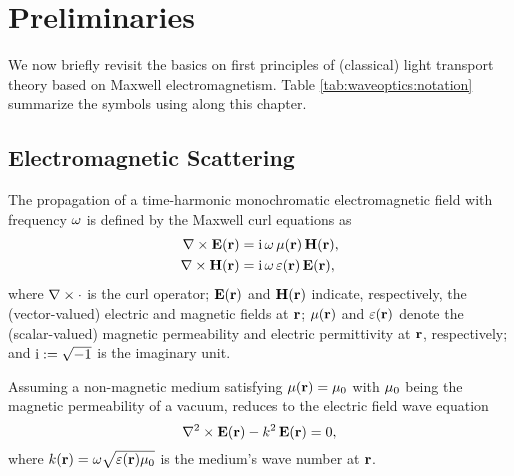 \section{Preliminaries}
\label{sec:waveoptics:prelim}

We now briefly revisit the basics on first principles of (classical) light transport theory based on Maxwell electromagnetism. Table \ref{tab:waveoptics:notation} summarize the symbols using along this chapter.



\subsection{Electromagnetic Scattering}
\label{ssec:prelim_maxwells}

The propagation of a time-harmonic monochromatic electromagnetic field with frequency $\omega$ is defined by the Maxwell curl equations as
\begin{equation}
    \begin{aligned}
        \nabla\times\mathbf{E}(\mathbf{r}) &= \text{i}\,\omega\,\mu(\mathbf{r})\,\mathbf{H}(\mathbf{r}),\\
        \nabla\times\mathbf{H}(\mathbf{r}) &= \text{i}\,\omega\,\varepsilon(\mathbf{r})\,\mathbf{E}(\mathbf{r}),
    \end{aligned}
    \label{eq:maxwell}
\end{equation}
where $\nabla\times\cdot$ is the curl operator; $\mathbf{E}(\mathbf{r})$ and $\mathbf{H}(\mathbf{r})$ indicate, respectively, the (vector-valued) electric and magnetic fields at $\mathbf{r}$; $\mu(\mathbf{r})$ and $\varepsilon(\mathbf{r})$ denote the (scalar-valued) magnetic permeability and electric permittivity at $\mathbf{r}$, respectively; and $\text{i} := \sqrt{-1}$ is the imaginary unit.

Assuming a non-magnetic medium satisfying $\mu(\mathbf{r}) = \mu_0$ with $\mu_0$ being the magnetic permeability of a vacuum,  reduces to the electric field wave equation
\begin{equation}
    \nabla^2\times\mathbf{E}(\mathbf{r}) - k^2\,\mathbf{E}(\mathbf{r}) = 0,
    \label{eq:efieldwave}
\end{equation}
where $k(\mathbf{r}) = \omega\sqrt{\varepsilon(\mathbf{r})\mu_0}$ is the medium's wave number at $\mathbf{r}$. 

